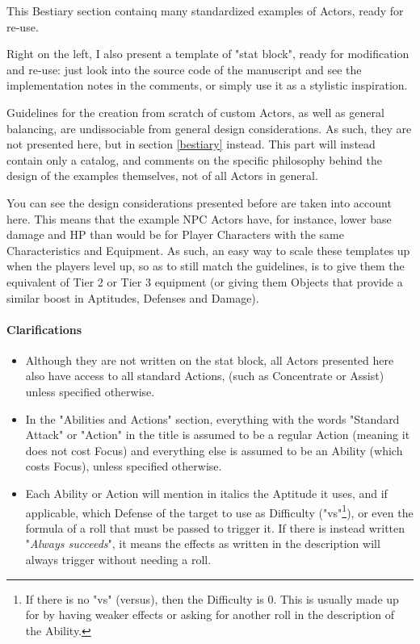 This Bestiary section containq many standardized examples of Actors, ready for re-use.

Right on the left, I also present a template of "stat block", ready for modification and re-use: just look into the source code of the manuscript and see the implementation notes in the comments, or simply use it as a stylistic inspiration.

\begin{rpg-examplebox}
    Guidelines for the creation from scratch of custom Actors, as well as general balancing, are undissociable from general design considerations. As such, they are not presented here, but in section \ref{bestiary} instead. This part will instead contain only a catalog, and comments on the specific philosophy behind the design of the examples themselves, not of all Actors in general.
\end{rpg-examplebox}

You can see the design considerations presented before are taken into account here. This means that the example NPC Actors have, for instance, lower base damage and HP than would be for Player Characters with the same Characteristics and Equipment. As such, an easy way to scale these templates up when the players level up, so as to still match the guidelines, is to give them the equivalent of Tier 2 or Tier 3 equipment (or giving them Objects that provide a similar boost in Aptitudes, Defenses and Damage).

\paragraph{Clarifications}

\begin{itemize}
    \item Although they are not written on the stat block, all Actors presented here also have access to all standard Actions, (such as Concentrate or Assist) unless specified otherwise.
    \item In the "Abilities and Actions" section, everything with the words "Standard Attack" or "Action" in the title is assumed to be a regular Action (meaning it does not cost Focus) and everything else is assumed to be an Ability (which costs Focus), unless specified otherwise.
    \item Each Ability or Action will mention in italics the Aptitude it uses, and if applicable, which Defense of the target to use as Difficulty ("vs"\footnote{If there is no "vs" (versus), then the Difficulty is 0. This is usually made up for by having weaker effects or asking for another roll in the description of the Ability.}), or even the formula of a roll that must be passed to trigger it. If there is instead written "\textit{Always succeeds}", it means the effects as written in the description will always trigger without needing a roll.
\end{itemize}



